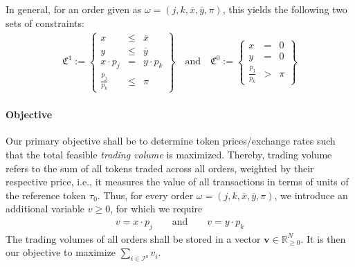 \documentclass[11pt,parskip=full]{scrartcl}%
\newcommand*{\ie}{i.e., }
\newcommand*{\iorders}{\mathcal{I}^o}       %
\begin{document}
In general, for an order given as $ \omega = (j,k,\overline{x},\overline{y},\pi) $, this yields
the following two sets of constraints:
\begin{align}
  \mathfrak{C}^1 := \left\{
  \begin{array}{rll}
    x &\le & \overline{x} \\
    y &\le & \overline{y} \\
    x \cdot p_j &= & y \cdot p_k \\[1mm]
    \frac{p_j}{p_k} &\le & \pi
  \end{array}
  \right\}
  \quad
  \text{and}
  \quad
  \mathfrak{C}^0 := \left\{
  \begin{array}{rll}
    x &= & 0 \\
    y &= & 0 \\[1mm]
    \frac{p_j}{p_k} &> & \pi
  \end{array}
  \right\}
  \label{eq:order_model_generic}
\end{align}

\paragraph{Objective}

Our primary objective shall be to determine token prices/exchange rates such that the total
feasible \emph{trading volume} is maximized.
Thereby, trading volume refers to the sum of all tokens traded across all orders, weighted by their
respective price, \ie it measures the value of all transactions in terms of units of the reference
token $ \tau_0 $.
Thus, for every order $ \omega = (j,k,\overline{x},\overline{y},\pi) $, we introduce an additional
variable $ v \ge 0 $, for which we require
\begin{align}
  v = x \cdot p_j \qquad \text{and} \qquad v = y \cdot p_k
  \label{eq:trading_volume}
\end{align}
The trading volumes of all orders shall be stored in a vector
$ \mathbf{v} \in \mathbb{R}^N_{\ge 0} $.
It is then our objective to maximize $ \sum_{i \in \iorders} v_i $.
\end{document}
